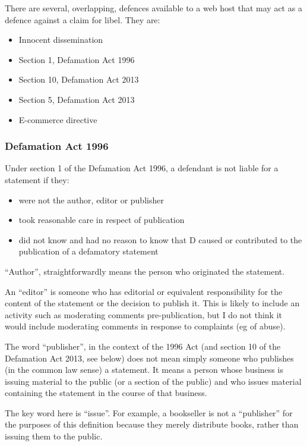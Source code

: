 \documentclass[]{article}
\begin{document}
There are several, overlapping, defences available to a web host that may act as a defence against a claim for libel. They are:

\begin{itemize}
\item Innocent dissemination
\item Section 1, Defamation Act 1996
\item Section 10, Defamation Act 2013
\item Section 5, Defamation Act 2013
\item E-commerce directive
\end{itemize}

\subsubsection{Defamation Act 1996}

Under section 1 of the Defamation Act 1996, a defendant is not liable
for a statement if they:

\begin{itemize}
\item were not the author, editor or publisher
\item took reasonable care in respect of publication
\item did not know and had no reason to know that D caused or contributed to
  the publication of a defamatory statement
\end{itemize}

``Author'', straightforwardly means the person who originated the statement. 

An ``editor'' is someone who has editorial or equivalent responsibility for the content of the statement or the decision to publish it. This is likely to include an activity such as moderating comments pre-publication, but I do not think it would include moderating comments in response to complaints (eg of abuse). 

The word ``publisher'', in the context of the 1996 Act (and section 10 of the Defamation Act 2013, see below) does not mean simply someone who publishes (in the common law sense) a statement. It means a person whose business is issuing material to the public (or a section of the public) and who issues material containing the statement in the course of that business.

The key word here is ``issue''. For example, a bookseller is not a ``publisher'' for the purposes of this definition because they merely distribute books, rather than issuing them to the public. 
\end{document}
